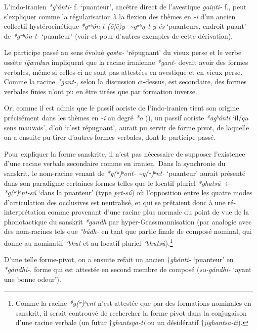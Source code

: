 \documentclass[11pt]{article}
\newcommand{\ipa}[1]{{\phon\textit{#1}}}
\begin{document}
L'indo-iranien \ipa{*gʰánti-} f. `puanteur', ancêtre direct de l'avestique \ipa{gaiṇti-} f., peut s'expliquer comme la régularisation à la flexion des thèmes en \ipa{-i} d'un ancien collectif hystérocinétique \ipa{*gʷʰón-t-(ō|ē)y- \textasciitilde *gʷʰṇ-t-y-és} `puanteurs, endroit puant' de  \ipa{*gʷʰón-t-} `puanteur' (voir \citealt{oettinger95kollektiv} et \citealt{ garnier13ghosti} pour d'autres exemples de cette dérivation).

Le participe passé au sens évolué \ipa{gasta-} `répugnant' du vieux perse et le verbe ossète \ipa{iǧændun} impliquent que la racine iranienne \ipa{*gant-} devait avoir des formes verbales, même si celles-ci ne sont pas attestées en avestique et en vieux perse. Comme la racine \ipa{*gant-}, selon la discussion ci-dessus, est secondaire, des formes verbales finies n'ont pu en être tirées que par formation inverse. 

Or, comme il est admis que le passif aoriste de l'indo-iranien tient son origine précisément dans les thèmes en \ipa{-i} au degré \ipa{*o} (\citealt[15]{kummel96stativ}), un passif aoriste \ipa{*agʰánti} `il/ça sens mauvais', d'où `c'est répugnant', aurait pu servir de forme pivot, de laquelle on a ensuite pu tirer d'autres formes verbales, dont le participe passé.

Pour expliquer la forme sanskrite, il n'est pas nécessaire de supposer l'existence d'une racine verbale secondaire comme en iranien. Dans la synchronie du sanskrit, le nom-racine venant de \ipa{*g(ʷ)ʰont- \textasciitilde *g(ʷ)ʰnt-} `puanteur' aurait présenté dans son paradigme certaines formes telles que le locatif pluriel \ipa{*ghatsú} $\leftarrow$ \ipa{*g(ʷ)ʰṇt-sú} `dans la puanteur' (type \ipa{pṛt-sú}) où l'opposition entre les quatre modes d'articulation des occlusives est neutralisé, et qui se prêtaient donc à une ré-interprétation comme provenant d'une racine plus normale du point de vue de la phonotactique du sanskrit \ipa{*gandh} par hyper-Grassmannisation (par analogie avec des nom-racines tels que \ipa{°búdh-} en tant que partie finale de composé nominal, qui donne au nominatif \ipa{°bhut} et au locatif pluriel \ipa{°bhutsú}).\footnote{Comme la racine \ipa{*g(ʷ)ʰent} n'est attestée que par des formations nominales en sanskrit, il serait controuvé de rechercher la forme pivot dans la conjugaison d'une racine verbale (un futur $\dagger$\ipa{ghantsya-ti} ou un désidératif $\dagger$\ipa{jighantsa-ti}). }

D'une telle forme-pivot, on a ensuite refait un ancien $\dagger$\ipa{ghánti-} `puanteur' en \ipa{*gándhi-}, forme qui est attestée en second membre de composé (\ipa{su-gándhi-} `ayant une bonne odeur').
\end{document}
